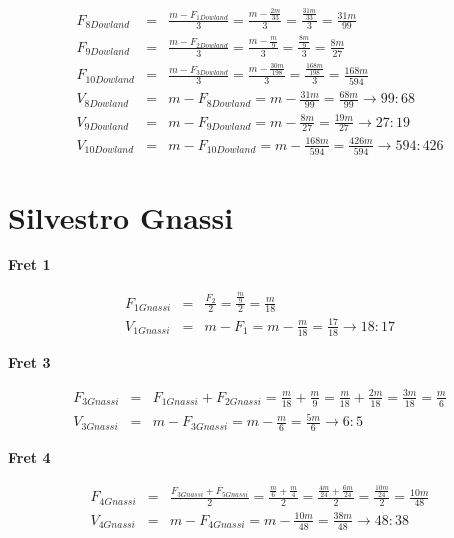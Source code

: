 \begin{eqnarray*}
    F_{8Dowland}
        &=& \frac{m-F_{1Dowland}}{3}
        = \frac{m - \frac{2m}{33}}{3}
        = \frac{\frac{31m}{33}}{3}
        = \frac{31m}{99} \\
    F_{9Dowland}
        &=& \frac{m-F_{2Dowland}}{3}
        = \frac{m - \frac{m}{9}}{3}
        = \frac{\frac{8m}{9}}{3}
        = \frac{8m}{27} \\
    F_{10Dowland}
        &=& \frac{m-F_{3Dowland}}{3}
        = \frac{m - \frac{30m}{198}}{3}
        =\frac{\frac{168m}{198}}{3}
        =\frac{168m}{594} \\
    V_{8Dowland}
        &=& m - F_{8Dowland}
        = m - \frac{31m}{99}
        = \frac{68m}{99}
        \to 99:68 \\
    V_{9Dowland}
        &=& m - F_{9Dowland}
        = m - \frac{8m}{27}
        = \frac{19m}{27}
        \to 27:19 \\
    V_{10Dowland}
        &=& m - F_{10Dowland}
        = m - \frac{168m}{594}
        = \frac{426m}{594}
        \to 594:426
\end{eqnarray*}

\section{Silvestro Gnassi}

\textbf{Fret 1}

\begin{eqnarray*}
    F_{1Gnassi}
        &=& \frac{F_2}{2}
        = \frac{\frac{m}{9}}{2}
        = \frac{m}{18} \\
    V_{1Gnassi}
        &=& m - F_1
        = m - \frac{m}{18}
        = \frac{17}{18}
        \to 18:17
\end{eqnarray*}

\textbf{Fret 3}

\begin{eqnarray*}
    F_{3Gnassi}
        &=& F_{1Gnassi} + F_{2Gnassi}
        = \frac{m}{18} + \frac{m}{9}
        = \frac{m}{18} + \frac{2m}{18}
        = \frac{3m}{18}
        = \frac{m}{6} \\
    V_{3Gnassi}
        &=& m - F_{3Gnassi}
        = m - \frac{m}{6}
        = \frac{5m}{6}
        \to 6:5
\end{eqnarray*}

\textbf{Fret 4}

\begin{eqnarray*}
    F_{4Gnassi}
        &=& \frac{F_{3Gnassi} + F_{5Gnassi}}{2}
        = \frac{\frac{m}{6} + \frac{m}{4}}{2}
        = \frac{\frac{4m}{24} + \frac{6m}{24}}{2}
        = \frac{\frac{10m}{24}}{2}
        = \frac{10m}{48} \\
    V_{4Gnassi}
        &=& m - F_{4Gnassi}
        = m - \frac{10m}{48}
        = \frac{38m}{48}
        \to 48:38
\end{eqnarray*}

